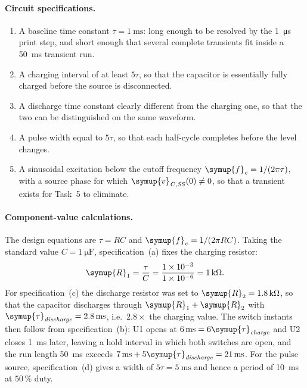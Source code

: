 \documentclass[12pt,a4paper]{article}
\begin{document}
	\paragraph{Circuit specifications.}
	\begin{enumerate}[label=(\alph*), leftmargin=2.5em]
		\item A baseline time constant $\tau = \SI{1}{\milli\second}$: long
		enough to be resolved by the \SI{1}{\micro\second} print step, and
		short enough that several complete transients fit inside a
		\SI{50}{\milli\second} transient run.
		\item A charging interval of at least $5\tau$, so that the capacitor
		is essentially fully charged before the source is disconnected.
		\item A discharge time constant clearly different from the charging
		one, so that the two can be distinguished on the same waveform.
		\item A pulse width equal to $5\tau$, so that each half-cycle
		completes before the level changes.
		\item A sinusoidal excitation below the cutoff frequency
		$\symup{f}_{\mathit{c}} = 1/(2\pi\tau)$, with a source phase for which
		$\symup{v}_{\mathit{C,SS}}(0) \neq 0$, so that a transient exists for Task~5
		to eliminate.
	\end{enumerate}
	
	\paragraph{Component-value calculations.}
	The design equations are $\tau = RC$ and
	$\symup{f}_{\mathit{c}} = 1/(2\pi RC)$.  Taking the standard value
	$C = \SI{1}{\micro\farad}$, specification~(a) fixes the charging
	resistor:
	\begin{equation}
		\symup{R}_{1} = \frac{\tau}{C}
		= \frac{1\times 10^{-3}}{1\times 10^{-6}} = \SI{1}{\kilo\ohm}.
		\label{eq:design-r1}
	\end{equation}
	For specification~(c) the discharge resistor was set to
	$\symup{R}_{2} = \SI{1.8}{\kilo\ohm}$, so that the capacitor discharges
	through $\symup{R}_{1} + \symup{R}_{2}$ with
	$\symup{\tau}_{\mathit{discharge}} = \SI{2.8}{\milli\second}$, i.e.\ $2.8\times$
	the charging value.  The switch instants then follow from
	specification~(b): U1 opens at $\SI{6}{\milli\second} = 6\symup{\tau}_{\mathit{charge}}$
	and U2 closes \SI{1}{\milli\second} later, leaving a hold interval in
	which both switches are open, and the run length
	\SI{50}{\milli\second} exceeds
	$\SI{7}{\milli\second} + 5\symup{\tau}_{\mathit{discharge}} = \SI{21}{\milli\second}$.
	For the pulse source, specification~(d) gives a width of
	$5\tau = \SI{5}{\milli\second}$ and hence a period of
	\SI{10}{\milli\second} at $50\,\%$ duty.
	
\end{document}

